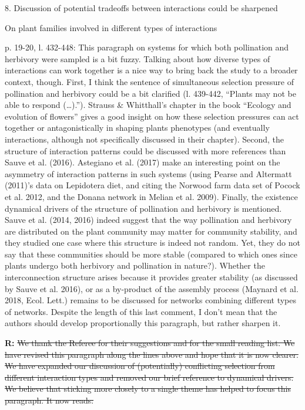 \documentclass[12pt]{letter}
\newenvironment{refquote}{\bigskip \begin{it}}{\end{it}\smallskip}
\providecommand{\DIFadd}[1]{{\protect\color{blue}\uwave{#1}}} %
\providecommand{\DIFdel}[1]{{\protect\color{red}\sout{#1}}}                      %
\providecommand{\DIFaddbegin}{} %
\providecommand{\DIFaddend}{} %
\providecommand{\DIFdelbegin}{} %
\providecommand{\DIFdelend}{} %
\newcommand{\DIFscaledelfig}{0.5}
\newlength{\DIFdelgraphicswidth} %
\newlength{\DIFdelgraphicsheight} %
\newcommand{\DIFaddincludegraphics}[2][]{{\color{blue}\fbox{\DIFOincludegraphics[#1]{#2}}}} %
\newcommand{\DIFdelincludegraphics}[2][]{%
\sbox{\DIFdelgraphicsbox}{\DIFOincludegraphics[#1]{#2}}%
\settoboxwidth{\DIFdelgraphicswidth}{\DIFdelgraphicsbox} %
\settoboxtotalheight{\DIFdelgraphicsheight}{\DIFdelgraphicsbox} %
\scalebox{\DIFscaledelfig}{%
\parbox[b]{\DIFdelgraphicswidth}{\usebox{\DIFdelgraphicsbox}\\[-\baselineskip] \rule{\DIFdelgraphicswidth}{0em}}\llap{\resizebox{\DIFdelgraphicswidth}{\DIFdelgraphicsheight}{%
\setlength{\unitlength}{\DIFdelgraphicswidth}%
\begin{picture}(1,1)%
\thicklines\linethickness{2pt} %
{\color[rgb]{1,0,0}\put(0,0){\framebox(1,1){}}}%
{\color[rgb]{1,0,0}\put(0,0){\line( 1,1){1}}}%
{\color[rgb]{1,0,0}\put(0,1){\line(1,-1){1}}}%
\end{picture}%
}\hspace*{3pt}}} %
} %
\DeclareRobustCommand{\DIFaddbegin}{\DIFOaddbegin \let\includegraphics\DIFaddincludegraphics} %
\DeclareRobustCommand{\DIFaddend}{\DIFOaddend \let\includegraphics\DIFOincludegraphics} %
\DeclareRobustCommand{\DIFdelbegin}{\DIFOdelbegin \let\includegraphics\DIFdelincludegraphics} %
\DeclareRobustCommand{\DIFdelend}{\DIFOaddend \let\includegraphics\DIFOincludegraphics} %
\begin{document}
8. Discussion of potential tradeoffs between interactions could be sharpened \DIFaddbegin \DIFadd{(discussion)
}\DIFaddend 

	\begin{refquote}
		On plant families involved in different types of interactions
\DIFdelbegin %
\DIFdelend 

		p. 19-20, l. 432-448: This paragraph on systems for which both pollination and herbivory were sampled is a bit fuzzy. Talking about how diverse types of interactions can work together is a nice way to bring back the study to a broader context, though.
		First, I think the sentence of simultaneous selection pressure of pollination and herbivory could be a bit clarified (l. 439-442, “Plants may not be able to respond (…).”). Strauss \& Whitthall’s chapter in the book “Ecology and evolution of flowers” gives a good insight on how these selection pressures can act together or antagonistically in shaping plants phenotypes (and eventually interactions, although not specifically discussed in their chapter).
		Second, the structure of interaction patterns could be discussed with more references than Sauve et al. (2016). Astegiano et al. (2017) make an interesting point on the asymmetry of interaction patterns in such systems (using Pearse and Altermatt (2011)’s data on Lepidotera diet, and citing the Norwood farm data set of Pocock et al. 2012, and the Donana network in Melian et al. 2009).
		Finally, the existence dynamical drivers of the structure of pollination and herbivory is mentioned. Sauve et al. (2014, 2016) indeed suggest that the way pollination and herbivory are distributed on the plant community may matter for community stability, and they studied one case where this structure is indeed not random. Yet, they do not say that these communities should be more stable (compared to which ones since plants undergo both herbivory and pollination in nature?). Whether the interconnection structure arises because it provides greater stability (as discussed by Sauve et al. 2016), or as a by-product of the assembly process (Maynard et al. 2018, Ecol. Lett.) remains to be discussed for networks combining different types of networks.
		Despite the length of this last comment, I don’t mean that the authors should develop proportionally this paragraph, but rather sharpen it.
	\end{refquote}


	\textbf{R:} \DIFdelbegin \DIFdel{We thank the Referee for their suggestions and for the small reading list. We have revised this paragraph along the lines above and hope that it is now clearer. We have expanded our discussion of (potentially) conflicting selection from different interaction types and removed our brief reference to dynamical drivers. We believe that sticking more closely to a single theme has helped to focus this paragraph. It now reads:}%
\end{document}

